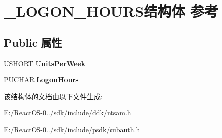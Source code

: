 \hypertarget{struct___l_o_g_o_n___h_o_u_r_s}{}\section{\+\_\+\+L\+O\+G\+O\+N\+\_\+\+H\+O\+U\+R\+S结构体 参考}
\label{struct___l_o_g_o_n___h_o_u_r_s}
\subsection*{Public 属性}
\begin{DoxyCompactItemize}
\item 
\mbox{\label{struct___l_o_g_o_n___h_o_u_r_s_aa911e2ff5534ec35de564aaebe45f73e}} 
U\+S\+H\+O\+RT {\bfseries Units\+Per\+Week}
\item 
\mbox{\label{struct___l_o_g_o_n___h_o_u_r_s_a1980acaf4732a65392e954c3a5a118d3}} 
P\+U\+C\+H\+AR {\bfseries Logon\+Hours}
\end{DoxyCompactItemize}


该结构体的文档由以下文件生成\+:\begin{DoxyCompactItemize}
\item 
E\+:/\+React\+O\+S-\/0../sdk/include/ddk/ntsam.\+h\item 
E\+:/\+React\+O\+S-\/0../sdk/include/psdk/subauth.\+h\end{DoxyCompactItemize}
